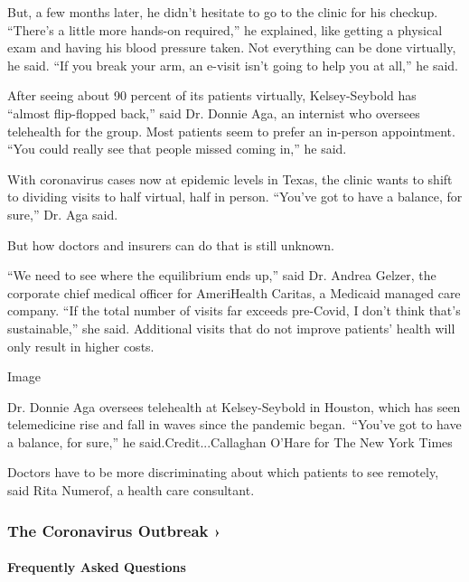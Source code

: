 But, a few months later, he didn't hesitate to go to the clinic for his
checkup. ``There's a little more hands-on required,'' he explained, like
getting a physical exam and having his blood pressure taken. Not
everything can be done virtually, he said. ``If you break your arm, an
e-visit isn't going to help you at all,'' he said.

After seeing about 90 percent of its patients virtually, Kelsey-Seybold
has ``almost flip-flopped back,'' said Dr. Donnie Aga, an internist who
oversees telehealth for the group. Most patients seem to prefer an
in-person appointment. ``You could really see that people missed coming
in,'' he said.

With coronavirus cases now at epidemic levels in Texas, the clinic wants
to shift to dividing visits to half virtual, half in person. ``You've
got to have a balance, for sure,'' Dr. Aga said.

But how doctors and insurers can do that is still unknown.

``We need to see where the equilibrium ends up,'' said Dr. Andrea
Gelzer, the corporate chief medical officer for AmeriHealth Caritas, a
Medicaid managed care company. ``If the total number of visits far
exceeds pre-Covid, I don't think that's sustainable,'' she said.
Additional visits that do not improve patients' health will only result
in higher costs.

Image

Dr. Donnie Aga oversees telehealth at Kelsey-Seybold in Houston, which
has seen telemedicine rise and fall in waves since the pandemic
began.~``You've got to have a balance, for sure,'' he
said.Credit...Callaghan O'Hare for The New York Times

Doctors have to be more discriminating about which patients to see
remotely, said Rita Numerof, a health care consultant.

\href{https://www.nytimes3xbfgragh.onion/news-event/coronavirus?action=click\&pgtype=Article\&state=default\&region=MAIN_CONTENT_3\&context=storylines_faq}{}

\hypertarget{the-coronavirus-outbreak-}{%
\subsubsection{The Coronavirus Outbreak
›}\label{the-coronavirus-outbreak-}}

\hypertarget{frequently-asked-questions}{%
\paragraph{Frequently Asked
Questions}\label{frequently-asked-questions}}

